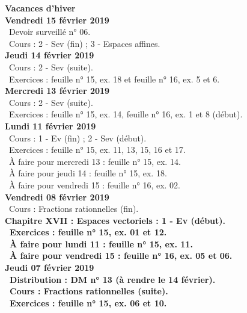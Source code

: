 \documentclass[12pt,a4paper]{article}
\begin{document}
\noindent\textbf{\bf Vacances d'hiver }\\

\noindent\textbf{Vendredi 15 février 2019}\\
\bu\ Devoir surveillé n° 06.\\
\bu\ Cours : 2 - Sev (fin) ; 3 - Espaces affines.\vspace{.4cm}\\
 
\noindent\textbf{Jeudi 14 février 2019}\\
\bu\ Cours : 2 - Sev (suite).\\
\bu\ Exercices : feuille n° 15, ex. 18 et feuille n° 16, ex. 5 et 6.\vspace{.4cm}\\
 
\noindent\textbf{Mercredi 13 février 2019} \\
\bu\ Cours : 2 - Sev (suite).\\
\bu\ Exercices : feuille n° 15, ex. 14, feuille n° 16, ex. 1 et 8 (début).\vspace{.4cm}\\

\noindent\textbf{\bf Lundi 11 février 2019} \\
\bu\ Cours : 1 - Ev (fin) ; 2 - Sev (début).\\
\bu\ Exercices : feuille n° 15, ex. 11, 13, 15, 16 et 17.\\
\bu\ À faire pour mercredi 13 : feuille n° 15, ex. 14.\\
\bu\ À faire pour jeudi 14 : feuille n° 15, ex. 18.\\
\bu\ À faire pour vendredi 15 : feuille n° 16, ex. 02.\vspace{.4cm}\\

\noindent\textbf{Vendredi 08 février 2019}\\
\bu\ Cours : Fractions rationnelles (fin).\\
\bf Chapitre XVII \rm : Espaces vectoriels : 1 - Ev (début).\\
\bu\ Exercices : feuille n° 15, ex. 01 et 12.\\
\bu\ À faire pour lundi 11 : feuille n° 15, ex. 11.\\
\bu\ À faire pour vendredi 15 : feuille n° 16, ex. 05 et 06.\vspace{.4cm}\\
 
\noindent\textbf{Jeudi 07 février 2019}\\
\bu\ Distribution : DM n° 13 (à rendre le 14 février).\\
\bu\ Cours : Fractions rationnelles (suite).\\
\bu\ Exercices : feuille n° 15, ex. 06 et 10.\vspace{.4cm}\\
 
\end{document}
